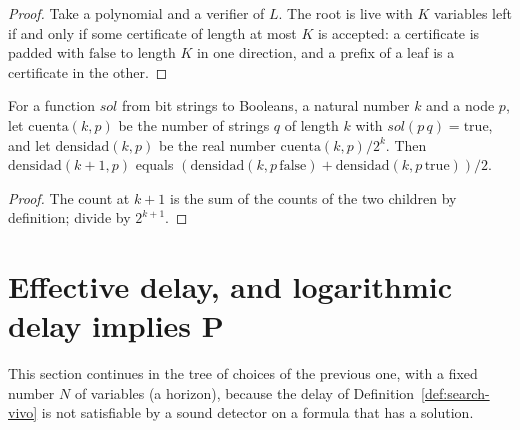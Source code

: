 \begin{proof}
  \leanok
  Take a polynomial and a verifier of $L$. The root is live with $K$ variables left if and only if
  some certificate of length at most $K$ is accepted: a certificate is padded with $\mathrm{false}$
  to length $K$ in one direction, and a prefix of a leaf is a certificate in the other.
\end{proof}

\begin{theorem}
  \label{thm:search-densidad-succ}
  \leanok
  For a function $\mathit{sol}$ from bit strings to Booleans, a natural number $k$ and a node $p$,
  let $\mathrm{cuenta}(k, p)$ be the number of strings $q$ of length $k$ with
  $\mathit{sol}(p\,q) = \mathrm{true}$, and let $\mathrm{densidad}(k, p)$ be the real number
  $\mathrm{cuenta}(k, p) / 2^k$. Then $\mathrm{densidad}(k+1, p)$ equals
  $(\mathrm{densidad}(k, p\,\mathrm{false}) + \mathrm{densidad}(k, p\,\mathrm{true})) / 2$.
  \own{}
\end{theorem}

\begin{proof}
  \leanok
  The count at $k+1$ is the sum of the counts of the two children by definition; divide by
  $2^{k+1}$.
\end{proof}

\section{Effective delay, and logarithmic delay implies P}
\label{sec:search-effective-delay}

This section continues in the tree of choices of the previous one, with a fixed number $N$ of
variables (a horizon), because the delay of Definition~\ref{def:search-vivo} is not satisfiable by
a sound detector on a formula that has a solution.


